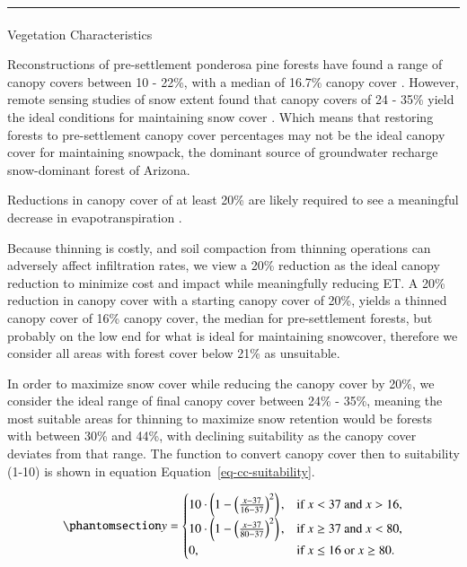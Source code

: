 \documentclass[
  number]{elsarticle}
\makeatletter
\let\oldparagraph\paragraph
\renewcommand{\paragraph}{
    \@ifstar
      \xxxParagraphStar
      \xxxParagraphNoStar
  }
\newcommand{\xxxParagraphStar}[1]{\oldparagraph*{#1}\mbox{}}
\newcommand{\xxxParagraphNoStar}[1]{\oldparagraph{#1}\mbox{}}
\makeatother
\begin{document}
\begin{center}\rule{0.5\linewidth}{0.5pt}\end{center}

\paragraph{Vegetation Characteristics}\label{vegetation-characteristics}

Reconstructions of pre-settlement ponderosa pine forests have found a
range of canopy covers between 10 - 22\%, with a median of 16.7\% canopy
cover \citep{huffman2012}. However, remote sensing studies of snow
extent found that canopy covers of 24 - 35\% yield the ideal conditions
for maintaining snow cover \citep{sankey2015, belmonte2021a}. Which
means that restoring forests to pre-settlement canopy cover percentages
may not be the ideal canopy cover for maintaining snowpack, the dominant
source of groundwater recharge snow-dominant forest of Arizona.

Reductions in canopy cover of at least 20\% are likely required to see a
meaningful decrease in evapotranspiration \citep{adams2012}.

Because thinning is costly, and soil compaction from thinning operations
can adversely affect infiltration rates, we view a 20\% reduction as the
ideal canopy reduction to minimize cost and impact while meaningfully
reducing ET. A 20\% reduction in canopy cover with a starting canopy
cover of 20\%, yields a thinned canopy cover of 16\% canopy cover, the
median for pre-settlement forests, but probably on the low end for what
is ideal for maintaining snowcover, therefore we consider all areas with
forest cover below 21\% as unsuitable.

In order to maximize snow cover while reducing the canopy cover by 20\%,
we consider the ideal range of final canopy cover between 24\% - 35\%,
meaning the most suitable areas for thinning to maximize snow retention
would be forests with between 30\% and 44\%, with declining suitability
as the canopy cover deviates from that range. The function to convert
canopy cover then to suitability (1-10) is shown in equation
Equation~\ref{eq-cc-suitability}.

\begin{equation}\phantomsection\label{eq-cc-suitability}{y =\begin{cases} 10 \cdot \left(1 - \left(\frac{x - 37}{16 - 37}\right)^2\right),& \text{if } x < 37 \text{ and } x > 16, \\10 \cdot \left(1 - \left(\frac{x - 37}{80 - 37}\right)^2\right), & \text{if } x \geq 37 \text{ and } x < 80, \\0, & \text{if } x \leq 16 \text{ or } x \geq 80.\end{cases}}\end{equation}
\end{document}
